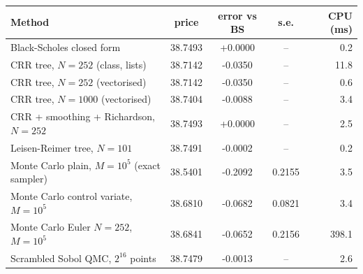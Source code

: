\begin{tabular}{lcccr}
\toprule
Method & price & error vs BS & s.e. & CPU (ms) \\
\midrule
Black-Scholes closed form & 38.7493 & +0.0000 & -- & 0.2 \\
CRR tree, $N=252$ (class, lists) & 38.7142 & -0.0350 & -- & 11.8 \\
CRR tree, $N=252$ (vectorised) & 38.7142 & -0.0350 & -- & 0.6 \\
CRR tree, $N=1000$ (vectorised) & 38.7404 & -0.0088 & -- & 3.4 \\
CRR + smoothing + Richardson, $N=252$ & 38.7493 & +0.0000 & -- & 2.5 \\
Leisen-Reimer tree, $N=101$ & 38.7491 & -0.0002 & -- & 0.2 \\
Monte Carlo plain, $M=10^5$ (exact sampler) & 38.5401 & -0.2092 & 0.2155 & 3.5 \\
Monte Carlo control variate, $M=10^5$ & 38.6810 & -0.0682 & 0.0821 & 3.4 \\
Monte Carlo Euler $N=252$, $M=10^5$ & 38.6841 & -0.0652 & 0.2156 & 398.1 \\
Scrambled Sobol QMC, $2^{16}$ points & 38.7479 & -0.0013 & -- & 2.6 \\
\bottomrule
\end{tabular}
